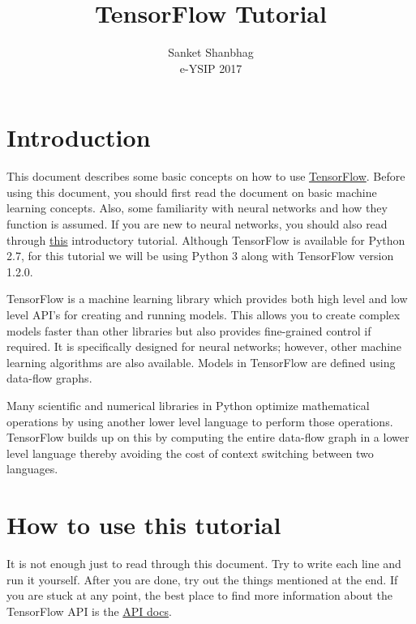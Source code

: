 \documentclass[Proceedings]{ascelike}
\begin{document}
%
\title{TensorFlow Tutorial}
%
\author{
Sanket Shanbhag \\
e-YSIP 2017
}
%
\maketitle
%
\section{Introduction}
This document describes some basic concepts on how to use \href{https://www.tensorflow.org/install/}{TensorFlow}. Before using this document, you should first read the document on basic machine learning concepts. Also, some familiarity with neural networks and how they function is assumed. If you are new to neural networks, you should also read through \href{http://neuralnetworksanddeeplearning.com/chap1.html}{this} introductory tutorial.
Although TensorFlow is available for Python 2.7, for this tutorial we will be using Python 3 along with TensorFlow version 1.2.0.

TensorFlow is a machine learning library which provides both high level and low level API's for creating and running models. This allows you to create complex models faster than other libraries but also provides fine-grained control if required. It is specifically designed for neural networks; however, other machine learning algorithms are also available. Models in TensorFlow are defined using data-flow graphs. 

Many scientific and numerical libraries in Python optimize mathematical operations by using another lower level language to perform those operations. TensorFlow builds up on this by computing the entire data-flow graph in a lower level language thereby avoiding the cost of context switching between two languages.

\section{How to use this tutorial}
It is not enough just to read through this document. Try to write each line and run it yourself. After you are done, try out the things mentioned at the end. If you are stuck at any point, the best place to find more information about the TensorFlow API is the \href{https://www.tensorflow.org/api_docs/}{API docs}.
\end{document}
